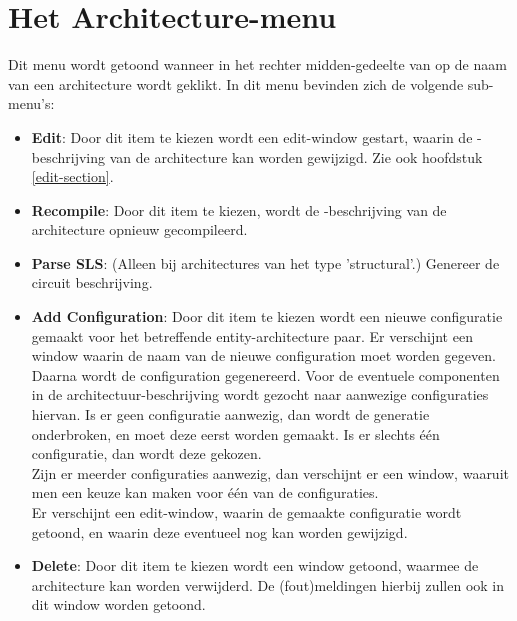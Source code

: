 \section{Het Architecture-menu}
Dit menu wordt getoond wanneer in het rechter midden-gedeelte van 
op de naam van een architecture wordt geklikt.
In dit menu bevinden zich de volgende sub-menu's:
\begin{itemize}
\item {\bf Edit}: Door dit item te kiezen wordt een edit-window gestart, waarin de
             -beschrijving van de architecture kan worden gewijzigd.
Zie ook hoofdstuk \ref{edit-section}.
\item {\bf Recompile}: Door dit item te kiezen, wordt de -beschrijving van
                  de  architecture opnieuw gecompileerd.
\item {\bf Parse SLS}: (Alleen bij architectures van het type 'structural'.)
                  Genereer de circuit beschrijving.
\item {\bf Add Configuration}: Door dit item te kiezen wordt een nieuwe
                         configuratie gemaakt voor het betreffende
                         entity-architecture paar. Er verschijnt een window
                         waarin de naam van de nieuwe configuration moet
                         worden gegeven. Daarna wordt de configuration
                         gegenereerd. Voor de eventuele componenten in
                         de architectuur-beschrijving wordt gezocht naar
                         aanwezige configuraties hiervan.
                         Is er geen configuratie aanwezig, dan wordt de
                         generatie onderbroken, en moet deze eerst worden
                         gemaakt.  Is er slechts
                         \'e\'en configuratie, dan wordt deze gekozen.\\
                         Zijn er meerder configuraties aanwezig,
                         dan verschijnt er een window, waaruit men een keuze
                         kan maken voor \'e\'en van de configuraties.\\
                         Er verschijnt een edit-window, waarin de
                         gemaakte configuratie wordt getoond, en waarin deze
                         eventueel nog kan worden gewijzigd.
\item {\bf Delete}: Door dit item te kiezen wordt een window getoond, waarmee de
             architecture kan worden verwijderd. De (fout)meldingen hierbij
             zullen ook in dit window worden getoond.
\end{itemize}

